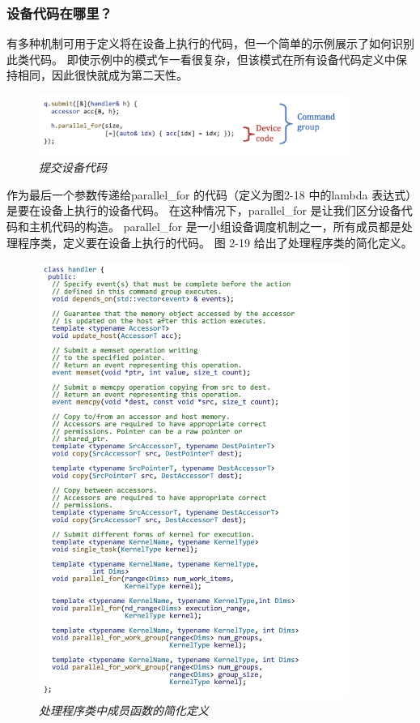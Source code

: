 \subsubsection{设备代码在哪里？}
有多种机制可用于定义将在设备上执行的代码，但一个简单的示例展示了如何识别此类代码。 
即使示例中的模式乍一看很复杂，但该模式在所有设备代码定义中保持相同，因此很快就成为第二天性。

\begin{figure}[H]
	\centering
	\includegraphics[width=0.9\textwidth]{figs/F2.18.png}
	\caption{\textit{提交设备代码}}
\end{figure}

作为最后一个参数传递给parallel\_for 的代码（定义为图2-18 中的lambda 表达式）是要在设备上执行的设备代码。 
在这种情况下，parallel\_for 是让我们区分设备代码和主机代码的构造。 
parallel\_for 是一小组设备调度机制之一，所有成员都是处理程序类，定义要在设备上执行的代码。 
图 2-19 给出了处理程序类的简化定义。

\begin{figure}[H]
	\centering
	\includegraphics[width=0.9\textwidth]{figs/F2.19.png}
	\caption{\textit{处理程序类中成员函数的简化定义}}
\end{figure}


